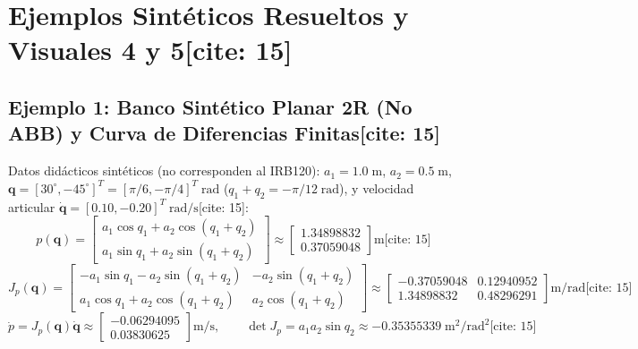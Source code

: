\documentclass[10pt, a4paper]{article}
\begin{document}
\section{Ejemplos Sintéticos Resueltos y Visuales 4 y 5[cite: 15]}

\subsection{Ejemplo 1: Banco Sintético Planar 2R (No ABB) y Curva de Diferencias Finitas[cite: 15]}
Datos didácticos sintéticos (no corresponden al IRB120): $a_1 = 1.0\;\mathrm{m}$, $a_2 = 0.5\;\mathrm{m}$, $\mathbf{q} = [30^\circ, -45^\circ]^T = [\pi/6, -\pi/4]^T\;\mathrm{rad}$ ($q_1+q_2 = -\pi/12\;\mathrm{rad}$), y velocidad articular $\dot{\mathbf{q}} = [0.10, -0.20]^T\;\mathrm{rad/s}$[cite: 15]:
\begin{equation}
    p(\mathbf{q}) = \begin{bmatrix} a_1\cos q_1 + a_2\cos(q_1+q_2) \\ a_1\sin q_1 + a_2\sin(q_1+q_2) \end{bmatrix} \approx \begin{bmatrix} 1.34898832 \\ 0.37059048 \end{bmatrix}\mathrm{m} \text{[cite: 15]}
\end{equation}
\begin{equation}
    J_p(\mathbf{q}) = \begin{bmatrix} -a_1\sin q_1 - a_2\sin(q_1+q_2) & -a_2\sin(q_1+q_2) \\ a_1\cos q_1 + a_2\cos(q_1+q_2) & a_2\cos(q_1+q_2) \end{bmatrix} \approx \begin{bmatrix} -0.37059048 & 0.12940952 \\ 1.34898832 & 0.48296291 \end{bmatrix}\mathrm{m/rad} \text{[cite: 15]}
\end{equation}
\begin{equation}
    \dot{p} = J_p(\mathbf{q})\dot{\mathbf{q}} \approx \begin{bmatrix} -0.06294095 \\ 0.03830625 \end{bmatrix}\mathrm{m/s}, \qquad
    \det J_p = a_1 a_2 \sin q_2 \approx -0.35355339\;\mathrm{m^2/rad^2} \text{[cite: 15]}
\end{equation}
\end{document}

